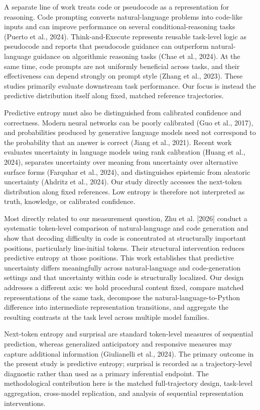 \documentclass[sn-mathphys-num]{sn-jnl}
\begin{document}
A separate line of work treats code or pseudocode as a representation for reasoning. Code prompting converts natural-language problems into code-like inputs and can improve performance on several conditional-reasoning tasks (Puerto et al., 2024). Think-and-Execute represents reusable task-level logic as pseudocode and reports that pseudocode guidance can outperform natural-language guidance on algorithmic reasoning tasks (Chae et al., 2024). At the same time, code prompts are not uniformly beneficial across tasks, and their effectiveness can depend strongly on prompt style (Zhang et al., 2023). These studies primarily evaluate downstream task performance. Our focus is instead the predictive distribution itself along fixed, matched reference trajectories.

Predictive entropy must also be distinguished from calibrated confidence and correctness. Modern neural networks can be poorly calibrated (Guo et al., 2017), and probabilities produced by generative language models need not correspond to the probability that an answer is correct (Jiang et al., 2021). Recent work evaluates uncertainty in language models using rank calibration (Huang et al., 2024), separates uncertainty over meaning from uncertainty over alternative surface forms (Farquhar et al., 2024), and distinguishes epistemic from aleatoric uncertainty (Ahdritz et al., 2024). Our study directly accesses the next-token distribution along fixed references. Low entropy is therefore not interpreted as truth, knowledge, or calibrated confidence.

Most directly related to our measurement question, Zhu et al. [2026] conduct a systematic token-level comparison of natural-language and code generation and show that decoding difficulty in code is concentrated at structurally important positions, particularly line-initial tokens. Their structural intervention reduces predictive entropy at those positions. This work establishes that predictive uncertainty differs meaningfully across natural-language and code-generation settings and that uncertainty within code is structurally localized. Our design addresses a different axis: we hold procedural content fixed, compare matched representations of the same task, decompose the natural-language-to-Python difference into intermediate representation transitions, and aggregate the resulting contrasts at the task level across multiple model families.

Next-token entropy and surprisal are standard token-level measures of sequential prediction, whereas generalized anticipatory and responsive measures may capture additional information (Giulianelli et al., 2024). The primary outcome in the present study is predictive entropy; surprisal is recorded as a trajectory-level diagnostic rather than used as a primary inferential endpoint. The methodological contribution here is the matched full-trajectory design, task-level aggregation, cross-model replication, and analysis of sequential representation interventions.
\end{document}
